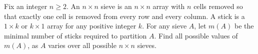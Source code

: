 Fix an integer $n \geq 2$. An $n\times n$ sieve is an $n\times n$ array with $n$ cells removed so that exactly one cell is removed from every row and every column. A stick is a $1\times k$ or $k\times 1$ array for any positive integer $k$. For any sieve $A$, let $m(A)$ be the minimal number of sticks required to partition $A$. Find all possible values of $m(A)$, as $A$ varies over all possible $n\times n$ sieves.